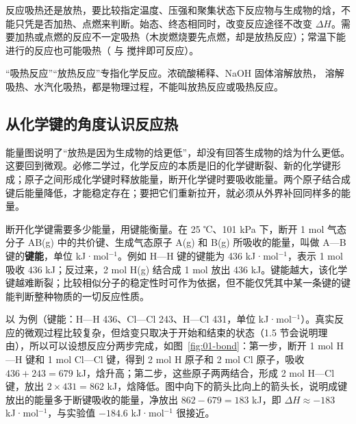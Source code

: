 \begin{yicuo}
反应吸热还是放热，要比较指定温度、压强和聚集状态下反应物与生成物的焓，不能只凭是否加热、点燃来判断。始态、终态相同时，改变反应途径不改变 $\Delta H$。需要加热或点燃的反应不一定吸热（木炭燃烧要先点燃，却是放热反应）；常温下能进行的反应也可能吸热（ 与  搅拌即可反应）。

“吸热反应”“放热反应”专指化学反应。浓硫酸稀释、NaOH 固体溶解放热， 溶解吸热、水汽化吸热，都是物理过程，不能叫放热反应或吸热反应。
\end{yicuo}

\subsection{从化学键的角度认识反应热}
能量图说明了“放热是因为生成物的焓更低”，却没有回答生成物的焓为什么更低。这要回到微观。必修二学过，化学反应的本质是旧的化学键断裂、新的化学键形成；原子之间形成化学键时释放能量，断开化学键时要吸收能量。两个原子结合成键后能量降低，才能稳定存在；要把它们重新拉开，就必须从外界补回同样多的能量。

断开化学键需要多少能量，用键能衡量。在 25 ℃、101 kPa 下，断开 1 mol 气态分子 AB(g) 中的共价键、生成气态原子 A(g) 和 B(g) 所吸收的能量，叫做 A—B 键的\textbf{键能}，单位 kJ·mol$^{-1}$。例如 H—H 键的键能为 436 kJ·mol$^{-1}$，表示 1 mol  吸收 436 kJ；反过来，2 mol H(g) 结合成 1 mol  放出 436 kJ。键能越大，该化学键越难断裂；比较相似分子的稳定性时可作为依据，但不能仅凭其中某一条键的键能判断整种物质的一切反应性质。

以  为例（键能：H—H 436、Cl—Cl 243、H—Cl 431，单位 kJ·mol$^{-1}$）。真实反应的微观过程比较复杂，但焓变只取决于开始和结束的状态（1.5 节会说明理由），所以可以设想反应分两步完成，如图~\ref{fig:01-bond}：第一步，断开 1 mol H—H 键和 1 mol Cl—Cl 键，得到 2 mol H 原子和 2 mol Cl 原子，吸收 $436+243=679$ kJ，焓升高；第二步，这些原子两两结合，形成 2 mol H—Cl 键，放出 $2\times431=862$ kJ，焓降低。图中向下的箭头比向上的箭头长，说明成键放出的能量多于断键吸收的能量，净放出 $862-679=183$ kJ，即 $\Delta H\approx-183$ kJ·mol$^{-1}$，与实验值 $-184.6$ kJ·mol$^{-1}$ 很接近。


